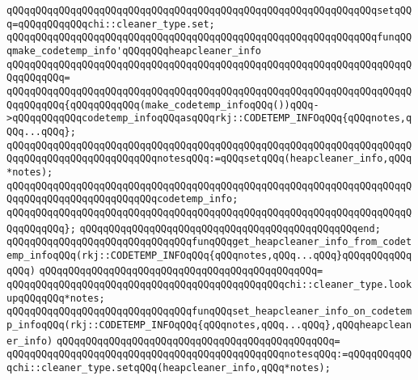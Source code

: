 \newline
\verb|qQQqqQQqqQQqqQQqqQQqqQQqqQQqqQQqqQQqqQQqqQQqqQQqqQQqqQQqqQQqqQQqsetqQQq=qQQqqQQqqQQqchi::cleaner_type.set;|\newline
\newline
\verb|qQQqqQQqqQQqqQQqqQQqqQQqqQQqqQQqqQQqqQQqqQQqqQQqqQQqqQQqqQQqqQQqfunqQQqmake_codetemp_info'qQQqqQQqheapcleaner_info|\newline
\verb|qQQqqQQqqQQqqQQqqQQqqQQqqQQqqQQqqQQqqQQqqQQqqQQqqQQqqQQqqQQqqQQqqQQqqQQqqQQqqQQq=|\newline
\verb|qQQqqQQqqQQqqQQqqQQqqQQqqQQqqQQqqQQqqQQqqQQqqQQqqQQqqQQqqQQqqQQqqQQqqQQqqQQqqQQq{qQQqqQQqqQQq(make_codetemp_infoqQQq())qQQq->qQQqqQQqqQQqcodetemp_infoqQQqasqQQqrkj::CODETEMP_INFOqQQq{qQQqnotes,qQQq...qQQq};|\newline
\newline
\verb|qQQqqQQqqQQqqQQqqQQqqQQqqQQqqQQqqQQqqQQqqQQqqQQqqQQqqQQqqQQqqQQqqQQqqQQqqQQqqQQqqQQqqQQqqQQqqQQqnotesqQQq:=qQQqsetqQQq(heapcleaner_info,qQQq*notes);|\newline
\newline
\verb|qQQqqQQqqQQqqQQqqQQqqQQqqQQqqQQqqQQqqQQqqQQqqQQqqQQqqQQqqQQqqQQqqQQqqQQqqQQqqQQqqQQqqQQqqQQqqQQqcodetemp_info;|\newline
\verb|qQQqqQQqqQQqqQQqqQQqqQQqqQQqqQQqqQQqqQQqqQQqqQQqqQQqqQQqqQQqqQQqqQQqqQQqqQQqqQQq};|\newline
\verb|qQQqqQQqqQQqqQQqqQQqqQQqqQQqqQQqqQQqqQQqqQQqqQQqend;|\newline
\newline
\newline
\verb|qQQqqQQqqQQqqQQqqQQqqQQqqQQqqQQqfunqQQqget_heapcleaner_info_from_codetemp_infoqQQq(rkj::CODETEMP_INFOqQQq{qQQqnotes,qQQq...qQQq}qQQqqQQqqQQqqQQq)|\newline
\verb|qQQqqQQqqQQqqQQqqQQqqQQqqQQqqQQqqQQqqQQqqQQqqQQq=|\newline
\verb|qQQqqQQqqQQqqQQqqQQqqQQqqQQqqQQqqQQqqQQqqQQqqQQqchi::cleaner_type.lookupqQQqqQQq*notes;|\newline
\newline
\newline
\verb|qQQqqQQqqQQqqQQqqQQqqQQqqQQqqQQqfunqQQqset_heapcleaner_info_on_codetemp_infoqQQq(rkj::CODETEMP_INFOqQQq{qQQqnotes,qQQq...qQQq},qQQqheapcleaner_info)|\newline
\verb|qQQqqQQqqQQqqQQqqQQqqQQqqQQqqQQqqQQqqQQqqQQqqQQq=|\newline
\verb|qQQqqQQqqQQqqQQqqQQqqQQqqQQqqQQqqQQqqQQqqQQqqQQqnotesqQQq:=qQQqqQQqqQQqchi::cleaner_type.setqQQq(heapcleaner_info,qQQq*notes);|\newline
